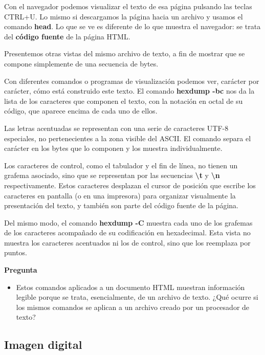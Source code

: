 \documentclass[spanish,a4paper,]{article}
\providecommand{\tightlist}{%
  \setlength{\itemsep}{0pt}\setlength{\parskip}{0pt}}
\begin{document}
Con el navegador podemos visualizar el texto de esa página pulsando las
teclas CTRL+U. Lo mismo si descargamos la página hacia un archivo y
usamos el comando \textbf{head}. Lo que se ve es diferente de lo que
muestra el navegador: se trata del \textbf{código fuente} de la página
HTML.

Presentemos otras vistas del mismo archivo de texto, a fin de mostrar
que se compone simplemente de una secuencia de bytes.

Con diferentes comandos o programas de visualización podemos ver,
carácter por carácter, cómo está construido este texto. El comando
\textbf{hexdump -bc} nos da la lista de los caracteres que componen el
texto, con la notación en octal de su código, que aparece encima de cada
uno de ellos.

Las letras acentuadas se representan con una serie de caracteres UTF-8
especiales, no pertenecientes a la zona visible del ASCII. El comando
separa el carácter en los bytes que lo componen y los muestra
individualmente.

Los caracteres de control, como el tabulador y el fin de línea, no
tienen un grafema asociado, sino que se representan por las secuencias
\textbf{\textbackslash{}t} y \textbf{\textbackslash{}n} respectivamente.
Estos caracteres desplazan el cursor de posición que escribe los
caracteres en pantalla (o en una impresora) para organizar visualmente
la presentación del texto, y también son parte del código fuente de la
página.

Del mismo modo, el comando \textbf{hexdump -C} muestra cada uno de los
grafemas de los caracteres acompañado de su codificación en hexadecimal.
Esta vista no muestra los caracteres acentuados ni los de control, sino
que los reemplaza por puntos.

\textbf{Pregunta}

\begin{itemize}
\tightlist
\item
  Estos comandos aplicados a un documento HTML muestran información
  legible porque se trata, esencialmente, de un archivo de texto. ¿Qué
  ocurre si los mismos comandos se aplican a un archivo creado por un
  procesador de texto?
\end{itemize}

\hypertarget{imagen-digital}{%
\subsection{Imagen digital}\label{imagen-digital}}
\end{document}
